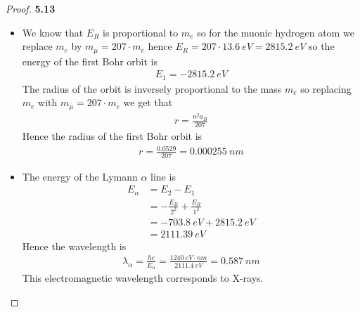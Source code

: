 \documentclass[11pt]{article}
\theoremstyle{definition}
\begin{document}
\begin{proof}{\textbf{5.13}}
\begin{itemize}
    \item [(a)] We know that $E_R$ is proportional to $m_e$ so for the muonic
    hydrogen atom we replace $m_e$ by $m_\mu = 207\cdot m_e$ hence
    $E_R = 207 \cdot 13.6~eV = 2815.2~eV$ so the energy of the first Bohr orbit
    is
    \begin{align*}
        E_1 = - 2815.2~eV
    \end{align*}
    The radius of the orbit is inversely proportional to the mass $m_e$ so
    replacing $m_e$ with $m_\mu = 207 \cdot m_e$ we get that
    \begin{align*}
        r = \frac{n^2 a_B}{207}
    \end{align*}
    Hence the radius of the first Bohr orbit is
    \begin{align*}
        r = \frac{0.0529}{207} = 0.000255~nm
    \end{align*}
    \item [(b)] The energy of the Lymann $\alpha$ line is
    \begin{align*}
        E_\alpha &= E_2 - E_1\\
        &= -\frac{E_R}{2^2} + \frac{E_R}{1^2}\\
        &= -703.8~eV + 2815.2~eV\\
        &= 2111.39~eV
    \end{align*}
    Hence the wavelength is 
    \begin{align*}
        \lambda_\alpha = \frac{hc}{E_\alpha}
        = \frac{1240~eV\cdot nm}{2111.4~eV}
        = 0.587~nm
    \end{align*}
    This electromagnetic wavelength corresponds to X-rays.
\end{itemize}
\end{proof}
\cleardoublepage
\end{document}

